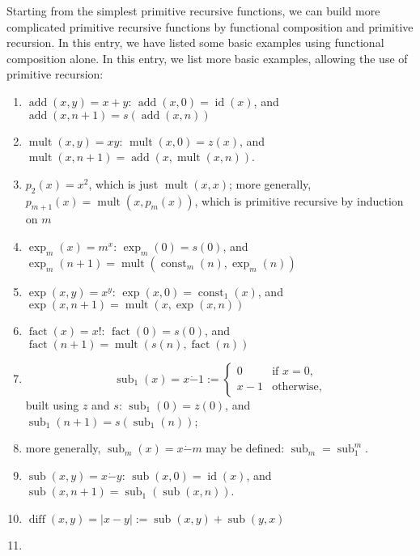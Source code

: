 \documentclass[12pt]{article}
\begin{document}
Starting from the simplest primitive recursive functions, we can build more complicated primitive recursive functions by functional composition and primitive recursion.  In this entry, we have listed some basic examples using functional composition alone.  In this entry, we list more basic examples, allowing the use of primitive recursion:

\begin{enumerate}
\item $\operatorname{add}(x,y)=x+y$: $\operatorname{add}(x,0)=\operatorname{id}(x)$, and $\operatorname{add}(x,n+1)=s(\operatorname{add}(x,n))$
\item $\operatorname{mult}(x,y)=xy$: $\operatorname{mult}(x,0)=z(x)$, and $\operatorname{mult}(x,n+1)=\operatorname{add}(x,\operatorname{mult}(x,n))$.
\item $p_2(x)=x^2$, which is just $\operatorname{mult}(x,x)$; more generally, $p_{m+1}(x)=\operatorname{mult}(x,p_m(x))$, which is primitive recursive by induction on $m$
\item $\exp_m(x)=m^x$: $\exp_m(0)=s(0)$, and $\exp_m(n+1)=\operatorname{mult}(\operatorname{const}_m(n),\exp_m(n))$
\item $\exp(x,y)=x^y$: $\exp(x,0)=\operatorname{const}_1(x)$, and $\exp(x,n+1)=\operatorname{mult}(x,\exp(x,n))$
\item $\operatorname{fact}(x)=x!$: $\operatorname{fact}(0)=s(0)$, and $\operatorname{fact}(n+1)=\operatorname{mult}(s(n),\operatorname{fact}(n))$
\item 
\begin{displaymath}
\operatorname{sub}_1(x)=x\dot{-} 1:= \left\{
\begin{array}{ll}
0 & \textrm{if } x =0, \\
x-1 & \textrm{otherwise,}
\end{array}
\right.
\end{displaymath}
built using $z$ and $s$: $\operatorname{sub}_1(0)=z(0)$, and $\operatorname{sub}_1(n+1)= s(\operatorname{sub}_1(n))$; 
\item more generally, $\operatorname{sub}_m(x)=x\dot{-}m$ may be defined: $\operatorname{sub}_m=\operatorname{sub}_1^m$.
\item $\operatorname{sub}(x,y)=x\dot{-}y$: $\operatorname{sub}(x,0)=\operatorname{id}(x)$, and $\operatorname{sub}(x,n+1)=\operatorname{sub}_1(\operatorname{sub}(x,n))$.
\item $\operatorname{diff}(x,y)=|x-y|:=\operatorname{sub}(x,y)+\operatorname{sub}(y,x)$
\item

\end{enumerate}
\end{document}
